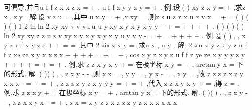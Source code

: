 可偏导,并且u
f
f
z
x
x
z
x
\partial 
\partial 
\partial 
\partial 
=
+
\cdots 
\partial 
\partial 
\partial 
\partial , u
f
f
z
y
y
z
y
\partial 
\partial 
\partial 
\partial 
=
+
\cdots 
\partial 
\partial 
\partial 
\partial . 
\textcolor{lyred}{例}.设
(
)
xy
z
x
y
=
+
,求z
x
\partial 
\partial , z
y
\partial 
\partial . 
解.设
v
z
u
=
,其中
u
x
y
=
+
,v
xy
=
,则z
z
u
z
v
x
u
x
v x
\partial 
\partial \partial 
\partial \partial 
=
+
=
\partial 
\partial 
\partial 
\partial \partial 
(
)
(
)
(
)
1 2
ln
ln 2
xy
xy
v
v
vu
u
u y
xy
x
y
x
y
x
y
y
-
-\cdots +
\cdots 
=
+
\cdots +
+
+
\cdots 
, 
(
)
(
)
(
)
ln 2
xy
xy
z
z
u
z
v
xy
x
y
x
y
x
y
x
y
u
y
v y
-
\partial 
\partial \partial 
\partial \partial 
=
+
=
+
\cdots +
+
+
\cdots 
\partial 
\partial 
\partial 
\partial \partial 
. 
\textcolor{lyred}{例}.设
(
)
, ,
x
y
z
u
f x y z
e
+
+
=
=
,其中
2 sin
z
x
y
=
,求u
x
\partial 
\partial , u
y
\partial 
\partial . 
解.
2 sin
x
y
z
x
y
z
u
f
f
z
xe
ze
x
y
x
x
z
x
+
+
+
+
\partial 
\partial 
\partial 
\partial 
=
+
\cdots 
=
+
\cdots 
\partial 
\partial 
\partial 
\partial 
, 
cos
x
y
z
x
y
z
u
f
f
z
ye
ze
x
y
y
y
z
y
+
+
+
+
\partial 
\partial 
\partial 
\partial 
=
+
\cdots 
=
+
\cdots 
\partial 
\partial 
\partial 
\partial 
. 
\textcolor{lyred}{例}.求
z
z
x
y
x
y
\partial 
\partial 
+
=
\partial 
\partial 
在极坐标
x
y
\rho =
+
,
arctan y
x
\theta =
下的形式. 
解.
(
)(
)
,
,
z
x y
\rho \theta 
-
-
,则
x
x
\rho 
\rho 
\partial 
=
\partial 
,
y
y
\rho 
\rho 
\partial 
=
\partial 
,
y
x
\theta 
\rho 
\partial 
-
=
\partial 
,
x
y
\theta 
\rho 
\partial 
=
\partial 
,故 
z
z
z
z
x
z
y
x
x
x
\rho 
\theta 
\rho 
\theta 
\rho \rho 
\theta 
\rho 
\partial 
\partial 
\partial 
\partial 
\partial 
\partial 
\partial 
-
=
\cdots 
+
\cdots 
=
\cdots 
+
\cdots 
\partial 
\partial 
\partial 
\partial 
\partial 
\partial 
\partial 
, 
z
z
z
z
y
z
x
y
y
y
\rho 
\theta 
\rho 
\theta 
\rho \rho 
\theta 
\rho 
\partial 
\partial 
\partial 
\partial 
\partial 
\partial 
\partial 
=
\cdots 
+
\cdots 
=
\cdots 
+
\cdots 
\partial 
\partial 
\partial 
\partial 
\partial 
\partial 
\partial 
,代入
z
z
x
y
x
y
\partial 
\partial 
+
=
\partial 
\partial 
,得
z
\rho \rho 
\partial 
=
\partial 
. 
\textcolor{lyred}{例}.求
z
z
x
y
\partial 
\partial 
+
=
\partial 
\partial 
在极坐标
x
y
\rho =
+
,
arctan y
x
\theta =
下的形式. 
解.
(
)(
)
,
,
z
x y
\rho \theta 
-
-
,
z
z
x
z
y
x
\rho \rho 
\theta 
\rho 
\partial 
\partial 
\partial 
-
=
\cdots 
+
\cdots 
\partial 
\partial 
\partial 
,
z
x
\partial 
=
\partial 
x
y
z
z
x
z
z
z
y
z
x
x
x
x
x
x
\rho 
\rho 
\rho 
\rho 
\rho 
\theta 
\rho 
\theta 
\rho 
\rho \theta 
\rho 
\rho 
\rho 
\theta \rho 
\theta 
\rho 
\theta 
\rho 
\partial 
\partial 
\cdots 
-\cdots 
\cdots 
\cdots 




